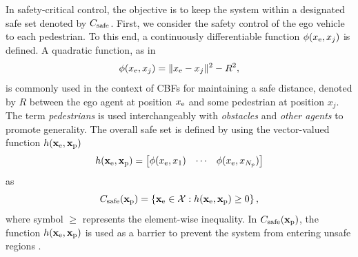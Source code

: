 \documentclass[journal]{IEEEtran}
\begin{document}
In safety-critical control, the objective is to keep the system within a designated safe set denoted by $C_{\rm safe}$. 
First, we consider the safety control of the ego vehicle to each pedestrian.
To this end, a continuously differentiable function $\phi({x}_{\rm e},x_j)$ is defined. A quadratic function, as in 
\begin{equation}
    \phi({x}_{\rm e},x_j) = \lVert x_{\rm e}-x_j\rVert^2 - R^2,
\label{h_quad}
\end{equation}
is commonly used in the context of CBFs \cite{lyu2022responsibilityassociated, zeng2021mpccbf} for maintaining a safe distance, denoted by $R$ between the ego agent at position $x_{\rm e}$ and some pedestrian at position $x_j$. The term \textit{pedestrians} is used interchangeably with \textit{obstacles} and \textit{other agents} to promote generality.
The overall safe set is defined by using the vector-valued function $h(\mathbf{x}_{\rm e},\mathbf{x}_{\rm p})$
\begin{equation}
h(\mathbf{x}_{\rm e},\mathbf{x}_{\rm p})= \begin{bmatrix}
           \phi({x}_{\rm e},x_1)& \cdots & \phi({x}_{\rm e},x_{N_p})\\
         \end{bmatrix}
\end{equation}
as
\begin{equation}
C_{\rm safe}(\mathbf{x}_{\rm p}) = \left\{ \mathbf{x}_{\rm e} \in \mathcal{X}  : h(\mathbf{x}_{\rm e},\mathbf{x}_{\rm p}) \geq 0 \right\},
\end{equation}
where symbol $\geq$ represents the element-wise inequality. 
In $C_{\rm safe}(\mathbf{x}_{\rm p})$, the function $h(\mathbf{x}_{\rm e},\mathbf{x}_{\rm p})$ is 
 used as a barrier to prevent the system from entering unsafe regions \cite{ames2019control}.
\end{document}
